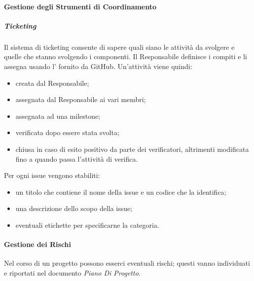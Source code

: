 \paragraph{Gestione degli Strumenti di Coordinamento}
\subparagraph*{Ticketing} \hfill \break
Il sistema di ticketing consente di sapere quali siano le attività da svolgere e quelle che stanno svolgendo i 
componenti. Il Responsabile definisce i compiti e li assegna usando l' fornito 
da GitHub. Un'attività viene quindi:
\begin{itemize}
    \item creata dal Responsabile;
    \item assegnata dal Responsabile ai vari membri;
    \item assegnata ad una milestone;
    \item verificata dopo essere stata svolta;
    \item chiusa in caso di esito positivo da parte dei verificatori, altrimenti modificata fino a quando passa l'attività di verifica. 
\end{itemize}
Per ogni issue vengono stabiliti:
\begin{itemize}
    \item un titolo che contiene il nome della issue e un codice che la identifica;
    \item una descrizione dello scopo della issue;
    \item eventuali etichette per specificarne la categoria.
\end{itemize}

\paragraph{Gestione dei Rischi}
Nel corso di un progetto possono esserci eventuali rischi; questi vanno individuati e riportati nel documento 
\emph{Piano Di Progetto}.

